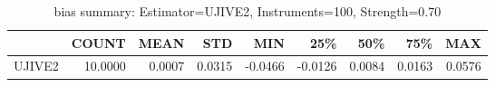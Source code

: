 \begin{table}[ht]
\centering
\caption{bias summary: Estimator=UJIVE2, Instruments=100, Strength=0.70}
\begin{tabular}{lrrrrrrrr}
\toprule
 & COUNT & MEAN & STD & MIN & 25\% & 50\% & 75\% & MAX \\
\midrule
UJIVE2 & 10.0000 & 0.0007 & 0.0315 & -0.0466 & -0.0126 & 0.0084 & 0.0163 & 0.0576 \\
\bottomrule
\end{tabular}
\end{table}
